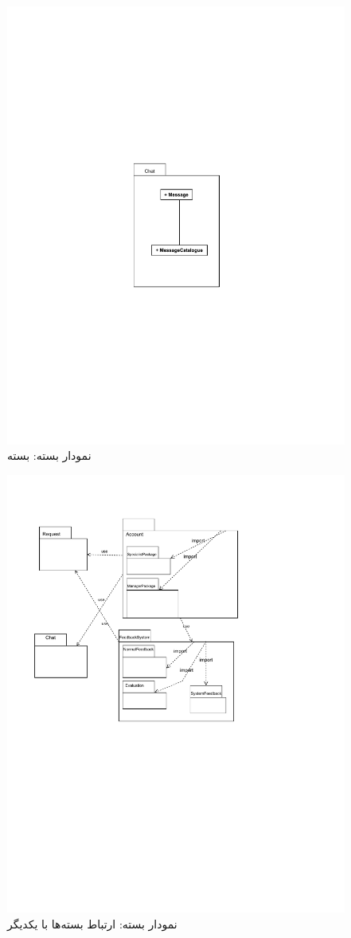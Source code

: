 \begin{figure}[ht!]
	\centering
	\includegraphics[scale=0.8]{figs/OOD-package-4.pdf}
	\caption{نمودار بسته: بسته }
\end{figure}
\FloatBarrier
\newpage

\begin{figure}[ht!]
	\centering
	\includegraphics[scale=0.8]{figs/OOD-package-5.pdf}
	\caption{نمودار بسته:  ارتباط بسته‌ها با یکدیگر}
\end{figure}
\FloatBarrier
\newpage

